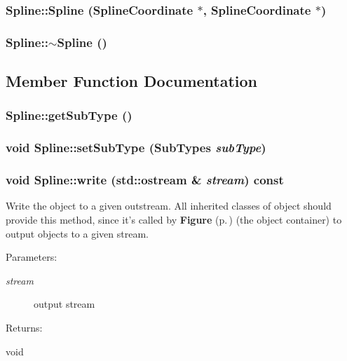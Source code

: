 \subsubsection{\setlength{\rightskip}{0pt plus 5cm}Spline::Spline ({\bf Spline\-Coordinate} $\ast$, {\bf Spline\-Coordinate} $\ast$)}\label{classSpline_a1}


\subsubsection{\setlength{\rightskip}{0pt plus 5cm}Spline::$\sim$Spline ()}\label{classSpline_a2}




\subsection{Member Function Documentation}
\subsubsection{ Spline::get\-Sub\-Type ()\hspace{0.3cm}{\tt  [inline]}}\label{classSpline_a4}


\subsubsection{\setlength{\rightskip}{0pt plus 5cm}void Spline::set\-Sub\-Type ({\bf Sub\-Types} {\em sub\-Type})\hspace{0.3cm}{\tt  [inline]}}\label{classSpline_a3}


\subsubsection{\setlength{\rightskip}{0pt plus 5cm}void Spline::write (std::ostream \& {\em stream}) const\hspace{0.3cm}{\tt  [virtual]}}\label{classSpline_a5}


Write the object to a given outstream. All inherited classes of object should provide this method, since it's called by {\bf Figure} {\rm (p.\,\pageref{classFigure})} (the object container) to output objects to a given stream. \begin{Desc}
\item[Parameters: ]\par
\begin{description}
\item[{\em 
stream}]output stream \end{description}
\end{Desc}
\begin{Desc}
\item[Returns: ]\par
void \end{Desc}


